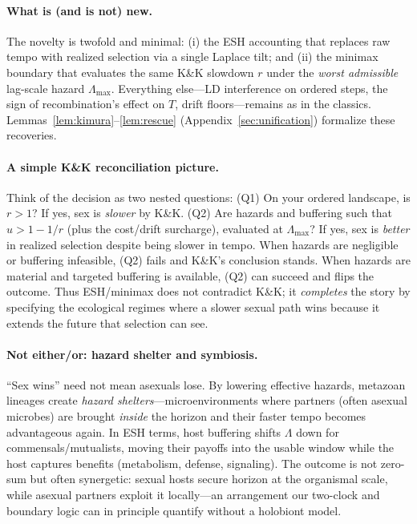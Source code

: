 \documentclass[11pt]{article}
\theoremstyle{upright}
\newcommand{\horizon}{\Lambda}
\newcommand{\Lmax}{\horizon^{(T)}_{\max}}
\renewcommand{\Lmax}{\Lambda_{\max}}
\begin{document}
\paragraph{What is (and is not) new.}
The novelty is twofold and minimal: (i) the ESH accounting that replaces raw tempo with realized selection via a single Laplace tilt; and (ii) the minimax boundary that evaluates the same K\&K slowdown $r$ under the \emph{worst admissible} lag-scale hazard $\Lmax$. Everything else—LD interference on ordered steps, the sign of recombination’s effect on $T$, drift floors—remains as in the classics. Lemmas~\ref{lem:kimura}–\ref{lem:rescue} (Appendix~\ref{sec:unification}) formalize these recoveries.

\paragraph{A simple K\&K reconciliation picture.}
Think of the decision as two nested questions: (Q1) On your ordered landscape, is $r>1$? If yes, sex is \emph{slower} by K\&K. (Q2) Are hazards and buffering such that $u>1-1/r$ (plus the cost/drift surcharge), evaluated at $\Lmax$? If yes, sex is \emph{better} in realized selection despite being slower in tempo. When hazards are negligible or buffering infeasible, (Q2) fails and K\&K’s conclusion stands. When hazards are material and targeted buffering is available, (Q2) can succeed and flips the outcome. Thus ESH/minimax does not contradict K\&K; it \emph{completes} the story by specifying the ecological regimes where a slower sexual path wins because it extends the future that selection can see.

\paragraph{Not either/or: hazard shelter and symbiosis.}
“Sex wins” need not mean asexuals lose. By lowering effective hazards, metazoan lineages create \emph{hazard shelters}—microenvironments where partners (often asexual microbes) are brought \emph{inside} the horizon and their faster tempo becomes advantageous again. In ESH terms, host buffering shifts $\Lambda$ down for commensals/mutualists, moving their payoffs into the usable window while the host captures benefits (metabolism, defense, signaling). The outcome is not zero-sum but often synergetic: sexual hosts secure horizon at the organismal scale, while asexual partners exploit it locally—an arrangement our two-clock and boundary logic can in principle quantify without a holobiont model.
\end{document}
